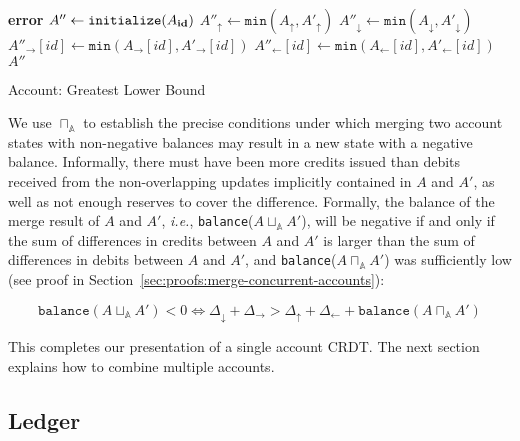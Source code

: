 \documentclass[9pt]{article}   	%
\begin{document}
\begin{algorithm}
\begin{algorithmic}[1]
     
		\textbf{error}
	\EndIf
	\State
        \State $A'' \leftarrow \texttt{initialize}(A_{\footnotesize \textbf{id}})$
        \State $A''_\uparrow \leftarrow \texttt{min}(A_\uparrow, A'_\uparrow)$
        \State $A''_\downarrow \leftarrow \texttt{min}(A_\downarrow, A'_\downarrow)$ 
	 
		\State $A''_{\rightarrow}[id] \leftarrow \texttt{min}(A_{\rightarrow}[id], A'_{\rightarrow}[id])$
	\EndFor
	 
		\State $A''_{\leftarrow}[id] \leftarrow \texttt{min}(A_{\leftarrow}[id], A'_{\leftarrow}[id])$
	\EndFor
	\State \Return $A''$	
    \EndFunction
\end{algorithmic}
\caption{\label{alg:account-hlb} Account: Greatest Lower Bound}
\end{algorithm}


We use $\sqcap_\mathds{A}$ to establish the precise conditions under which merging two account states with non-negative balances may result in a new state with a negative balance.  Informally, there must have been more credits issued than debits received from the non-overlapping updates implicitly contained in $A$ and $A'$, as well as not enough reserves to cover the difference. Formally, the balance of the merge result of $A$ and $A'$, \textit{i.e.}, \texttt{balance}($A \sqcup_\mathds{A} A'$), will be negative if and only if the sum of differences in credits between $A$ and $A'$ is larger than the sum of differences in debits between $A$ and $A'$, and \texttt{balance}($A \sqcap_\mathds{A} A'$) was sufficiently low (see proof in Section~\ref{sec:proofs:merge-concurrent-accounts}):

\begin{equation}
\texttt{balance}(A \sqcup_\mathds{A} A') < 0 \Leftrightarrow  \Delta_\downarrow  + \Delta_\rightarrow >  \Delta_\uparrow  + \Delta_\leftarrow + \texttt{balance}(A \sqcap_\mathds{A} A')
\end{equation}

This completes our presentation of a single account CRDT. The next section explains how to combine multiple accounts.

\subsection{Ledger}
\label{sec:ledger}
\end{document}
